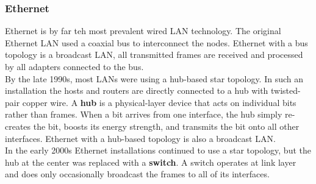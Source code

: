 \subsubsection{Ethernet}
Ethernet is by far teh most prevalent wired LAN technology. The original Ethernet LAN used a coaxial bus to interconnect the nodes. Ethernet with a bus topology is a broadcast LAN, all transmitted frames are received and processed by all adapters connected to the bus.\\
By the late 1990s, most LANs were using a hub-based star topology. In such an installation the hosts and routers are directly connected to a hub with twisted-pair copper wire. A \textbf{hub} is a physical-layer device that acts on individual bits rather than frames. When a bit arrives from one interface, the hub  simply re-creates the bit, boosts its energy strength, and transmits the bit onto all other interfaces. Ethernet with a hub-based topology is also a broadcast LAN.\\
In the early 2000s Ethernet installations continued to use a star topology, but the hub at the center was replaced with a \textbf{switch}. A switch operates at link layer and does only occasionally broadcast the frames to all of its interfaces.\vspace{.3cm}\\

